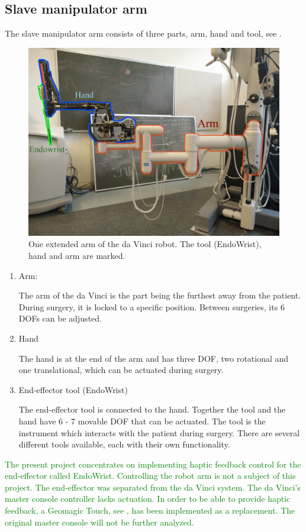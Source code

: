 

\subsection*{Slave manipulator arm}
The slave manipulator arm consists of three parts, arm, hand and tool, see .

\begin{figure}[H]
	\centering
		\centering
		\includegraphics[width=0.85\linewidth]{davincirobotarm_label.jpg}
		\caption{One extended arm of the da Vinci robot. The tool (EndoWrist), hand and arm are marked.}
		\label{fig:davinciarmrobot}
\end{figure}


\begin{enumerate}
\item Arm:

The arm of the da Vinci is the part being the furthest away from the patient. 
During surgery, it is locked to a specific position. Between surgeries, its 6 \gls{DOF}s can be adjusted.
\item Hand

The hand is at the end of the arm and has three \gls{DOF}, two rotational and one translational, which can be actuated during surgery. 
\item End-effector tool (EndoWrist)

The end-effector tool is connected to the hand. Together the tool and the hand have 6 - 7 movable \gls{DOF} that can be actuated. The tool is the instrument which interacts with the patient during surgery. There are several different tools available, each with their own functionality. 
\end{enumerate}

\textcolor{green}{The present project concentrates on implementing haptic feedback control for the end-effector called EndoWrist. Controlling the robot arm is not a subject of this project. The end-effector was separated from the da Vinci system. The da Vinci's master console controller lacks actuation. In order to be able to provide haptic feedback, a Geomagic Touch, see , has been implemented as a replacement. The original master console will not be further analyzed. 	
}